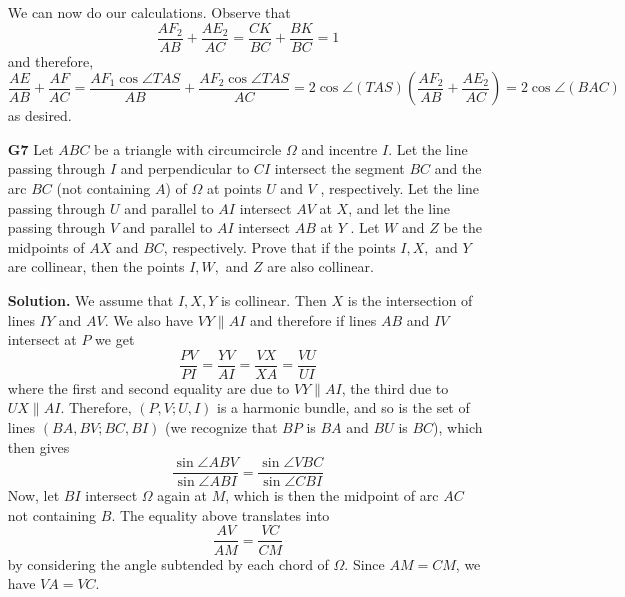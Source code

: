 \documentclass[11pt,a4paper]{article}
\begin{document}
\begin{enumerate}
	We can now do our calculations. Observe that 
	\[
	\frac{AF_2}{AB} + \frac{AE_2}{AC} = \frac{CK}{BC} + \frac{BK}{BC} = 1
	\]
	and therefore, 
	\[
	\frac{AE}{AB} + \frac{AF}{AC}
	 = \frac{AF_1\cos\angle TAS}{AB} + \frac{AF_2\cos\angle TAS}{AC}
	 = 2\cos\angle(TAS)(\frac{AF_2}{AB} + \frac{AE_2}{AC})
	 =2\cos\angle(BAC)
	\]
	as desired. 
	\item[\textbf{G7}] Let $ABC$ be a triangle with circumcircle $\Omega$ and incentre $I$. Let the line passing through $I$ and perpendicular to $CI$ intersect the segment $BC$ and the arc $BC$ (not containing $A$) of $\Omega$ at points $U$ and $V$ , respectively. Let the line passing through $U$ and parallel to $AI$ intersect $AV$ at $X$, and let the line passing through $V$ and parallel to $AI$ intersect $AB$ at $Y$ . Let $W$ and $Z$ be the midpoints of $AX$ and $BC$, respectively. Prove that if the points $I, X,$ and $Y$ are collinear, then the points $I, W ,$ and $Z$ are also collinear.
	
	\textbf{Solution.} We assume that $I, X, Y$ is collinear. Then $X$ is the intersection of lines $IY$ and $AV$. We also have $VY\parallel AI$ and therefore if lines $AB$ and $IV$ intersect at $P$ we get 
	\[
	\frac{PV}{PI} = \frac{YV}{AI} = \frac{VX}{XA} = \frac{VU}{UI}
	\]
	where the first and second equality are due to $VY\parallel AI$, the third due to $UX \parallel AI$. Therefore, $(P, V; U, I)$ is a harmonic bundle, and so is the set of lines $(BA, BV; BC, BI)$ (we recognize that $BP$ is $BA$ and $BU$ is $BC$), which then gives 
	\[
	\frac{\sin\angle ABV}{\sin\angle ABI} = \frac{\sin\angle VBC}{\sin\angle CBI}
	\]
	Now, let $BI$ intersect $\Omega$ again at $M$, which is then the midpoint of arc $AC$ not containing $B$. The equality above translates into 
	\[
	\frac{AV}{AM}=\frac{VC}{CM}
	\]
	by considering the angle subtended by each chord of $\Omega$. Since $AM=CM$, we have $VA=VC$. 
	

\end{enumerate}
\end{document}
